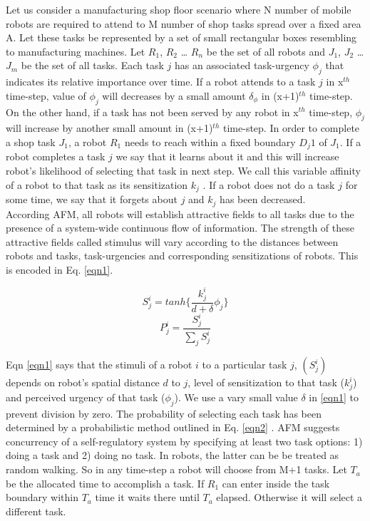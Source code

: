 \documentclass{llncs}
\begin{document}
Let us consider a manufacturing shop floor scenario where N number of mobile robots are required to attend to M number of shop tasks spread over a fixed area A. Let these tasks be represented by a set of small rectangular boxes resembling to manufacturing machines. Let $R_1$, $R_2$ … $R_n$ be the set of all robots and $J_1$, $J_2$ … $J_m$ be the set of all tasks. Each task $j$ has an associated task-urgency $\phi_j$ that indicates its relative importance over time. If a robot attends to a task $j$ in x$^{th}$ time-step, value of $\phi_j$ will decreases by a small amount $\delta_\phi$ in (x+1)$^{th}$ time-step. On the other hand, if a task has not been served by any robot in x$^{th}$ time-step, $\phi_j$ will increase by another small amount in (x+1)$^{th}$ time-step. In order to complete a shop task $J_1$, a robot $R_1$ needs to reach within a fixed boundary $D_j1$ of $J_1$. If a robot completes a task $j$ we say that it learns about it and this will increase robot's likelihood of selecting that task in next step. We call this variable affinity of a robot to that task as its sensitization $k_j$ . If a robot does not do a task $j$ for some time, we say that it forgets about $j$ and $k_j$ has been decreased.\\
According AFM, all robots will establish attractive fields to all tasks due to the presence of a system-wide continuous flow of information. The strength of these attractive fields called stimulus will vary according to the distances between robots and tasks, task-urgencies and corresponding sensitizations of robots. This is encoded in Eq. \ref{eqn1}.
\begin{small}
\begin{multicols}{2}
\begin{equation}
S_{j}^{i} = tanh\{\frac{k_{j}^{i}}{d+\delta } \phi _{j}\}
\label{eqn1}
\end{equation}
\vspace*{0.25cm}
\begin{equation}
P_{j}^{i} = \frac{S_{j}^{i}}{\sum_{j}^{}S_{j}^{i}}
\label{eqn2}
\end{equation}
\end{multicols}
\end{small}
Eqn \ref{eqn1} says that the stimuli of a robot $i$ to a particular task $j$, $(S_{j}^{i})$ depends on robot's spatial distance $d$ to $j$, level of sensitization to that task ($k_{j}^{i}$) and perceived urgency of that task ($\phi _{j}$). We use a vary small value $\delta$ in \ref{eqn1} to prevent division by zero. The probability of selecting each task has been determined by a probabilistic method outlined in Eq. \ref{eqn2} .
AFM suggests concurrency of a self-regulatory system by specifying at least two task options: 1) doing a task and 2) doing no task. In robots, the latter can be be treated as random walking. So in any time-step a robot will choose from M+1 tasks. Let $T_a$ be the allocated time to accomplish a task. If $R_1$ can enter inside the task boundary within $T_a$ time it waits there until $T_a$ elapsed. Otherwise it will select a different task.
\end{document}
